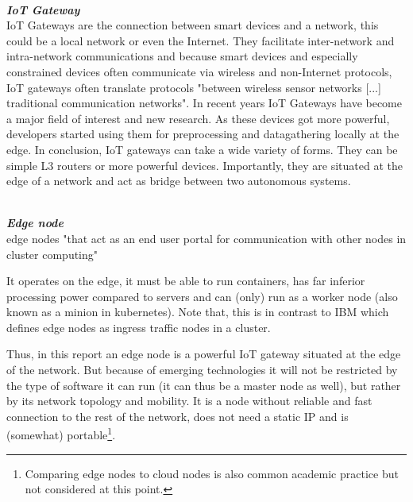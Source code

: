 \vspace{0.5mm}\\
\textbf{\textit{IoT Gateway}}\\
IoT Gateways are the connection between smart devices and a network, this could be a local network or even the Internet. They facilitate inter-network and intra-network communications and because smart devices and especially constrained devices often communicate via wireless and non-Internet protocols, IoT gateways often translate protocols "between wireless sensor networks [...] traditional communication networks"\cite{zhu2010iotGatewayDefinition}. 
In recent years IoT Gateways have become a major field of interest and new research. As these devices got more powerful, developers started using them for preprocessing and datagathering locally at the edge. 
In conclusion, IoT gateways can take a wide variety of forms. They can be simple L3 routers or more powerful devices. Importantly, they are situated at the edge of a network and act as bridge between two autonomous systems.


\vspace{0.5mm}\\
\textbf\textit{Edge node}\\
edge nodes "that act as an end user portal for communication with other nodes in cluster computing"\cite{Whatised17:edgeNodeDef}

It operates on the edge, it must be able to run containers, has far inferior processing power compared to servers and can (only) run as a worker node (also known as a minion in kubernetes)\cite{NodesKub7:edgeNodeMinion}. Note that, this is in contrast to IBM which defines edge nodes as ingress traffic nodes in a cluster\cite{IBMCloudEdgeNodes0:online}.

Thus, in this report an edge node is a powerful IoT gateway situated at the edge of the network. But because of emerging technologies it will not be restricted by the type of software it can run (it can thus be a master node as well), but rather by its network topology and mobility. It is a node without reliable and fast connection to the rest of the network, does not need a static IP and is (somewhat) portable\footnote{Comparing edge nodes to cloud nodes is also common academic practice\cite{contstraintDevicesTerminology}  but not considered at this point.}.

